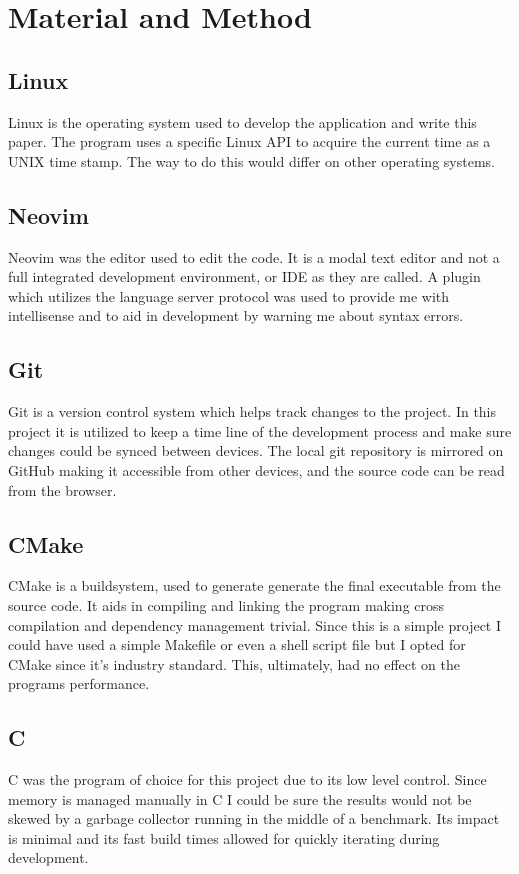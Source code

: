 \documentclass[a4paper, 12pt]{article}
\begin{document}
\section{Material and Method}

\subsection{Linux}
Linux is the operating system used to develop the application and write this
paper. The program uses a specific Linux API to acquire the current time as a
UNIX time stamp. The way to do this would differ on other operating systems.

\subsection{Neovim}
Neovim was the editor used to edit the code. It is a modal text editor and not a
full integrated development environment, or IDE as they are called. A plugin
which utilizes the language server protocol was used to provide me with
intellisense and to aid in development by warning me about syntax errors.

\subsection{Git}
Git is a version control system which helps track changes to the project. In
this project it is utilized to keep a time line of the development process and
make sure changes could be synced between devices. The local git repository is
mirrored on GitHub making it accessible from other devices, and the source code
can be read from the browser.

\subsection{CMake}
CMake is a buildsystem, used to generate generate the final executable from the
source code. It aids in compiling and linking the program making cross
compilation and dependency management trivial. Since this is a simple project I
could have used a simple Makefile or even a shell script file but I opted for
CMake since it's industry standard. This, ultimately, had no effect on the
programs performance.

\subsection{C}
C was the program of choice for this project due to its low level control.
Since memory is managed manually in C I could be sure the results would not be
skewed by a garbage collector running in the middle of a benchmark. Its impact
is minimal and its fast build times allowed for quickly iterating during
development.
\end{document}

